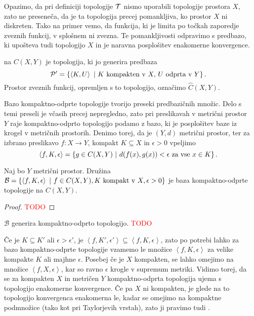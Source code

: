 Opazimo, da pri definiciji topologije \(\mathcal{T}\) nismo uporabili topologije prostora $X$, zato ne preseneča, da je ta topologija precej pomankljiva, ko prostor $X$ ni diskreten. Tako na primer vemo, da funkcija, ki je limita po točkah zaporedje zveznih funkcij, v splošnem ni zvezna. Te pomankljivosti odpravimo s predbazo, ki upošteva tudi topologijo $X$ in je naravna posplošitev enakomerne konvergence.

\begin{definicija}
     na $C(X,Y)$ je topologija, ki jo generira predbaza \[\mathcal{P'} = \left\{\left\langle K, U \right\rangle \ | \ K \text{ kompakten v } X, \, U \text{ odprta v } Y\right\}.\]
    Prostor zveznih funkcij, opremljen s to topologijo, označimo $\widehat{C}(X,Y)$. 
\end{definicija}

Bazo kompaktno-odprte topologije tvorijo preseki predbazičnih množic. Delo s temi preseli je včasih precej nepregledno, zato pri preslikavah v metrični prostor $Y$ raje kompaktno-odprto topologijo podamo z bazo, ki je posplošitev baze iz krogel v metričnih prostorih. Denimo torej, da je $(Y, d)$ metrični prostor, ter za izbrano preslikavo $f: X \to Y$, kompakt \(K \subseteq X\) in $\epsilon > 0$ vpeljimo  
$$\left\langle f, K, \epsilon \right\rangle = \left\{g \in C(X, Y) \ | \ d(f(x), g(x)) < \epsilon \text{ za vse } x \in K\right\}.$$

\begin{trditev}
    Naj bo $Y$ metrični prostor. Družina $\mathcal{B} = \left\{\left\langle f, K, \epsilon \right\rangle \ | \ f \in C(X, Y), K \text{ kompakt v } X, \epsilon>0\right\}$ je baza kompaktno-odprte topologije na $C(X, Y)$.
\end{trditev}

\begin{proof}
    \textcolor{red}{TODO}
\end{proof}

\begin{opomba}
    \(\mathcal{B}\) generira kompaktno-odprto topologijo. \textcolor{red}{TODO}
\end{opomba}

Če je $K \subseteq K'$ ali $\epsilon > \epsilon'$, je $\left\langle f, K', \epsilon' \right\rangle \subseteq \left\langle f, K, \epsilon \right\rangle$, zato po potrebi lahko za bazo kompaktno-odprte topologije vzamemo le množice \(\left\langle f, K, \epsilon \right\rangle\) za velike kompakte $K$ ali majhne $\epsilon$. Posebej če je $X$ kompakten, se lahko omejimo na množice \(\left\langle f, X, \epsilon \right\rangle\), kar so ravno $\epsilon$ krogle v supremum metriki. Vidimo torej, da se za kompakten $X$ in metričen $Y$ kompaktno-odprta topologija ujema s topologijo enakomerne konvergence. Če pa $X$ ni kompakten, je glede na to topologijo konvergenca enakomerna le, kadar se omejimo na kompaktne podmnožice (tako kot pri Taylorjevih vrstah), zato ji pravimo tudi .

